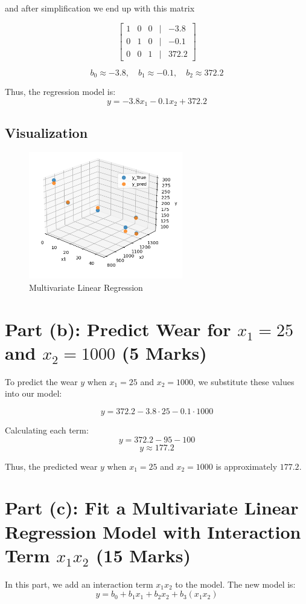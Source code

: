 \documentclass{article}
\begin{document}
	and after simplification we end up with this matrix
	
	\[
	\begin{bmatrix}
		1 & 0 & 0 & \vert & -3.8\\
		0 & 1 & 0 & \vert & -0.1\\
		0 & 0 & 1 & \vert & 372.2
	\end{bmatrix}
	\]
	
	\[
	b_0 \approx -3.8, \quad b_1 \approx -0.1, \quad b_2 \approx 372.2
	\]
	
	Thus, the regression model is:
	\[
	y = - 3.8 x_1 - 0.1 x_2 + 372.2
	\]
	
	\subsection*{Visualization} 
	\begin{figure}[h!]
		\centering
		\includegraphics[width=0.6\textwidth]{./images/task2a_output.png}
		\caption{Multivariate Linear Regression}
		\label{fig:image2}
	\end{figure}
	
	
	\section*{Part (b): Predict Wear for \( x_1 = 25 \) and \( x_2 = 1000 \) (5 Marks)}
	To predict the wear \( y \) when \( x_1 = 25 \) and \( x_2 = 1000 \), we substitute these values into our model:
	
	\[
	y = 372.2 - 3.8 \cdot 25 - 0.1 \cdot 1000
	\]
	
	Calculating each term:
	\[
	y = 372.2 - 95 - 100
	\]
	\[
	y \approx 177.2
	\]
	
	Thus, the predicted wear \( y \) when \( x_1 = 25 \) and \( x_2 = 1000 \) is approximately \( 177.2 \).
	
	 \section*{Part (c): Fit a Multivariate Linear Regression Model with Interaction Term \( x_1 x_2 \) (15 Marks)}
	In this part, we add an interaction term \( x_1 x_2 \) to the model. The new model is:
	\[
	y = b_0 + b_1 x_1 + b_2 x_2 + b_3 (x_1 x_2)
	\]
	
\end{document}
